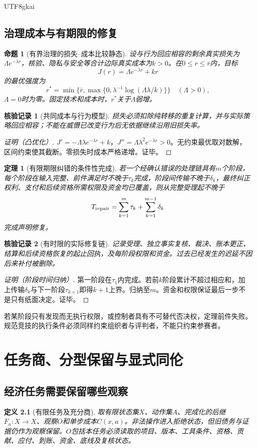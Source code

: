 \documentclass[12pt,a4paper,openany]{report}
\newtheorem{definition}{定义}[chapter]
\newtheorem{theorem}{定理}[chapter]
\newtheorem{proposition}{命题}[chapter]
\newtheorem{Certificate}{核验记录}[chapter]
\begin{document}
\begin{CJK*}{UTF8}{gkai}
\section{治理成本与有期限的修复}
\begin{proposition}[有界治理的损失--成本比较静态]
\label{prop:audit-opt}
设与行为回应相容的剩余真实损失为$\Lambda e^{-\lambda r}$，核验、隐私与安全等合计边际真实成本为$k>0$。在$0\le r\le\bar r$内，目标
\[
 J(r)=\Lambda e^{-\lambda r}+kr
\]
的最优强度为
\[
 r^*=\min\{\bar r,\max\{0,\lambda^{-1}\log(\Lambda\lambda/k)\}\}
 \quad(\Lambda>0),
\]
$\Lambda=0$时为零。固定技术和成本时，$r^*$关于$\Lambda$弱增。
\end{proposition}
\begin{Certificate}[共同成本与行为模型]
损失必须扣除纯转移的重复计算，并与实际策略回应相容；不能在威慑已改变行为后无依据继续沿用旧损失率。
\end{Certificate}
\begin{proof}[证明（凸优化）]
$J'=-\Lambda\lambda e^{-\lambda r}+k$，$J''=\Lambda\lambda^2e^{-\lambda r}>0$。无约束最优取对数解，区间约束使其截断。零损失时成本严格递增。证毕。
\end{proof}
\begin{theorem}[有限期限纠错的条件性完成]
\label{thm:repair}
若一个经确认错误的处理链具有$m$个阶段，每个阶段在输入完整、前件满足时不晚于$\tau_k$完成，阶段间传输不晚于$\delta_k$，最终纠正权利、支付和后续资格所需权限及资金均已覆盖，则从完整受理起不晚于
\[
 T_{\rm repair}=\sum_{k=1}^m\tau_k+\sum_{k=1}^{m-1}\delta_k
\]
完成声明修复。
\end{theorem}
\begin{Certificate}[有时限的实际修复链]
记录受理、独立事实复核、裁决、账本更正、结算和后续资格恢复的起止回执，及每阶段权限和资金。过去已经发生的迟延不因后来补付被删除。
\end{Certificate}
\begin{proof}[证明（阶段时间归纳）]
第一阶段在$\tau_1$内完成。若前$k$阶段累计不超过相应和，加上传输$\delta_k$与下一阶段$\tau_{k+1}$即得$k+1$上界。归纳至$m$。资金和权限保证最后一步不是只有纸面决定。证毕。
\end{proof}
若某阶段只有发现而无执行权限，或控制者具有不可替代否决权，定理前件失败。规范竞技的执行条件必须同样约束组织者与评判者，不能只约束参赛者。
\chapter{任务商、分型保留与显式同伦}
\label{chap:quotient}
\section{经济任务需要保留哪些观察}
\begin{definition}[有限任务及充分商]
\label{def:quotient}
取有限状态集$X$、动作集$A$、完成化的后继$F_a:X\to X$、观察$O$和单步成本$C(x,a)$。非法操作进入拒绝状态，但旧债务与证据仍作为观察保留。$O$包括本任务必须读取的项目、版本、工具条件、资格、贡献、应付、到账、资金、底线及复核状态。


\end{definition}
\end{CJK*}
\end{document}
